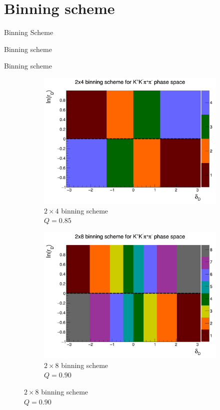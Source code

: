 \documentclass{beamer}
\begin{document}
\section{Binning scheme}
\begin{frame}{Binning Scheme}
  \begin{center}
    {\huge Binning scheme}
  \end{center}
\end{frame}

\begin{frame}{Binning scheme}
  \begin{figure}
    \centering
    \vspace{-0.2cm}
    \begin{subfigure}{0.5\textwidth}
      \includegraphics[width = 1.0\textwidth]{Plots/BinningScheme4BinsPlot.png}
      \caption{$2\times 4$ binning scheme \\ $Q = 0.85$}
    \end{subfigure}%
    \begin{subfigure}{0.5\textwidth}
      \includegraphics[width = 1.0\textwidth]{Plots/BinningScheme8BinsPlot.png}
      \caption{$2\times 8$ binning scheme \\ $Q = 0.90$}
    \end{subfigure}
  \end{figure}
\end{frame}
\end{document}
